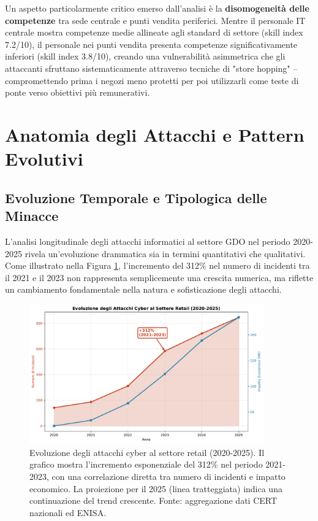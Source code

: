 Un aspetto particolarmente critico emerso dall'analisi è la \textbf{disomogeneità delle competenze} tra sede centrale e punti vendita periferici. Mentre il personale IT centrale mostra competenze medie allineate agli standard di settore (skill index 7.2/10), il personale nei punti vendita presenta competenze significativamente inferiori (skill index 3.8/10), creando una vulnerabilità asimmetrica che gli attaccanti sfruttano sistematicamente attraverso tecniche di "store hopping" – compromettendo prima i negozi meno protetti per poi utilizzarli come teste di ponte verso obiettivi più remunerativi.

\section{Anatomia degli Attacchi e Pattern Evolutivi}

\subsection{Evoluzione Temporale e Tipologica delle Minacce}

L'analisi longitudinale degli attacchi informatici al settore GDO nel periodo 2020-2025 rivela un'evoluzione drammatica sia in termini quantitativi che qualitativi. Come illustrato nella Figura \ref{fig:cyber_evolution}, l'incremento del 312\% nel numero di incidenti tra il 2021 e il 2023 non rappresenta semplicemente una crescita numerica, ma riflette un cambiamento fondamentale nella natura e sofisticazione degli attacchi.

\begin{figure}[htbp]
\centering
\includegraphics[width=0.9\textwidth]{thesis_figures/cap2/fig_2_1_cyber_evolution.pdf}
\caption{Evoluzione degli attacchi cyber al settore retail (2020-2025). Il grafico mostra l'incremento esponenziale del 312\% nel periodo 2021-2023, con una correlazione diretta tra numero di incidenti e impatto economico. La proiezione per il 2025 (linea tratteggiata) indica una continuazione del trend crescente. Fonte: aggregazione dati CERT nazionali ed ENISA.}
\label{fig:cyber_evolution}
\end{figure}

